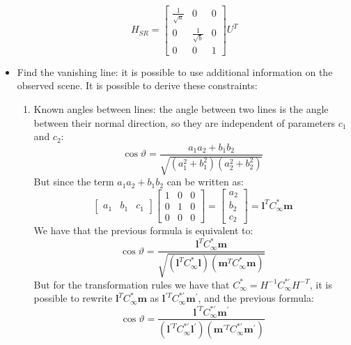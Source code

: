 \documentclass[12pt, a4paper]{report}
\newtheorem[style=M,bodystyle=\normalfont]{theorem}{Theorem}
\newtheorem[style=M,bodystyle=\normalfont]{corollary}{Corollary}
\newtheorem[style=M,bodystyle=\normalfont]{lemma}{Lemma}
\newtheorem[style=M,bodystyle=\normalfont]{definition}{Definition}
\begin{document}
\begin{itemize}
            \[H_{SR}=
            \begin{bmatrix}
                \frac{1}{\sqrt{a}} & 0 & 0 \\
                0 & \frac{1}{\sqrt{b}} & 0 \\
                0 & 0 & 1
            \end{bmatrix}
            U^T
            \]
        \item Find the vanishing line: it is possible to use additional information on the observed scene. It is possible to derive these constraints: 
            \begin{enumerate}
                \item Known angles between lines: the angle between two lines is the angle between their normal direction, so they are independent of parameters 
                    $c_1$ and $c_2$: 
                    \[\cos\vartheta=\dfrac{a_1a_2+b_1b_2}{\sqrt{(a_1^2+b_1^2)(a_2^2+b_2^2)}}\]
                    But since the term $a_1a_2+b_1b_2$ can be written as: 
                    \[\begin{bmatrix}
                        a_1 & b_1 & c_1
                    \end{bmatrix}
                    \begin{bmatrix}
                        1 & 0 & 0 \\
                        0 & 1 & 0 \\
                        0 & 0 & 0
                    \end{bmatrix}
                    =
                    \begin{bmatrix}
                        a_2 \\ b_2 \\ c_2
                    \end{bmatrix}
                    =
                    \boldsymbol{l}^TC_{\infty}^{*}\boldsymbol{m}
                    \]
                    We have that the previous formula is equivalent to: 
                    \[\cos\vartheta=\dfrac{\boldsymbol{l}^TC_{\infty}^{*}\boldsymbol{m}}{\sqrt{(\boldsymbol{l}^TC_{\infty}^{*}\boldsymbol{l})(\boldsymbol{m}^TC_{\infty}^{*}\boldsymbol{m})}}\]
                    But for the transformation rules we have that $C_{\infty}^{*}=H^{-1}C_{\infty}^{*'}H^{-T}$, it is possible to rewrite $\boldsymbol{l}^TC_{\infty}^{*}\boldsymbol{m}$ as 
                    $\boldsymbol{l}^{'T}C_{\infty}^{*'}\boldsymbol{m}^{'}$, and the previous formula: 
                    \[\cos\vartheta=\dfrac{\boldsymbol{l}^{'T}C_{\infty}^{*'}\boldsymbol{m}^{'}}{(\boldsymbol{l}^{'T}C_{\infty}^{*'}\boldsymbol{l}^{'})(\boldsymbol{m}^{'T}C_{\infty}^{*'}\boldsymbol{m}^{'})}\]

\end{enumerate}
\end{itemize}
\end{document}
